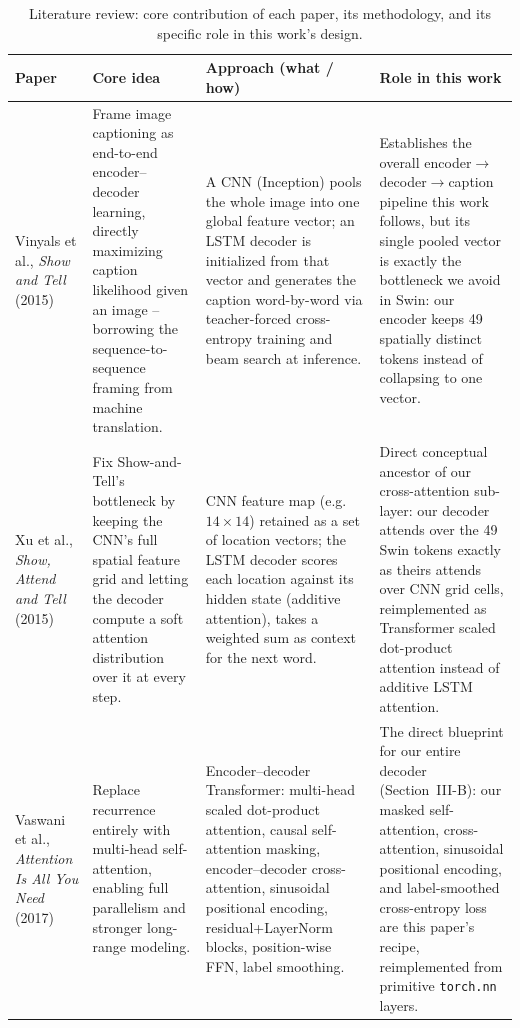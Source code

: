 \documentclass[conference]{IEEEtran}
\begin{document}
\begin{table}[t]
\centering
\caption{Literature review: core contribution of each paper, its methodology, and its specific role in this work's design.}
\label{tab:litreview}
\small
\begin{tabularx}{\textwidth}{@{}p{2.3cm}X X X@{}}
\toprule
\textbf{Paper} & \textbf{Core idea} & \textbf{Approach (what / how)} & \textbf{Role in this work} \\
\midrule

Vinyals et al., \emph{Show and Tell}~\cite{vinyals2015show} (2015)
&
Frame image captioning as end-to-end encoder--decoder learning, directly maximizing caption likelihood given an image -- borrowing the sequence-to-sequence framing from machine translation.
&
A CNN (Inception) pools the whole image into one global feature vector; an LSTM decoder is initialized from that vector and generates the caption word-by-word via teacher-forced cross-entropy training and beam search at inference.
&
Establishes the overall encoder$\to$decoder$\to$caption pipeline this work follows, but its single pooled vector is exactly the bottleneck we avoid in Swin: our encoder keeps 49 spatially distinct tokens instead of collapsing to one vector. \\

Xu et al., \emph{Show, Attend and Tell}~\cite{xu2015show} (2015)
&
Fix Show-and-Tell's bottleneck by keeping the CNN's full spatial feature grid and letting the decoder compute a soft attention distribution over it at every step.
&
CNN feature map (e.g.\ $14\times14$) retained as a set of location vectors; the LSTM decoder scores each location against its hidden state (additive attention), takes a weighted sum as context for the next word.
&
Direct conceptual ancestor of our cross-attention sub-layer: our decoder attends over the 49 Swin tokens exactly as theirs attends over CNN grid cells, reimplemented as Transformer scaled dot-product attention instead of additive LSTM attention. \\

Vaswani et al., \emph{Attention Is All You Need}~\cite{vaswani2017attention} (2017)
&
Replace recurrence entirely with multi-head self-attention, enabling full parallelism and stronger long-range modeling.
&
Encoder--decoder Transformer: multi-head scaled dot-product attention, causal self-attention masking, encoder--decoder cross-attention, sinusoidal positional encoding, residual+LayerNorm blocks, position-wise FFN, label smoothing.
&
The direct blueprint for our entire decoder (Section~III-B): our masked self-attention, cross-attention, sinusoidal positional encoding, and label-smoothed cross-entropy loss are this paper's recipe, reimplemented from primitive \texttt{torch.nn} layers. \\


\end{tabularx}
\end{table}
\end{document}
